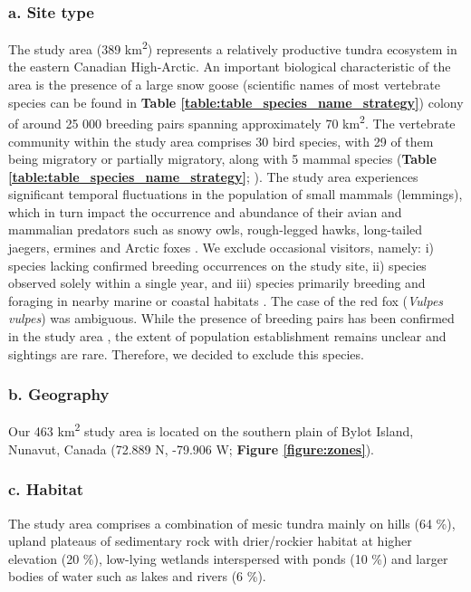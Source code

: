 \documentclass[a4paper,twoside,12pt]{article}
\begin{document}
                        \subsubsection*{a. Site type}
  The study area (389 km\textsuperscript{2}) represents a relatively productive tundra ecosystem in the eastern Canadian High-Arctic. An important biological characteristic of the area is the presence of a large snow goose (scientific names of most vertebrate species can be found in \textbf{Table \ref{table:table_species_name_strategy}}) colony of around 25 000 breeding pairs \citep{reed2002} spanning approximately 70 km\textsuperscript{2}. The vertebrate community within the study area comprises 30 bird species, with 29 of them being migratory or partially migratory, along with 5 mammal species (\textbf{Table \ref{table:table_species_name_strategy}}; \citet{moisan2023, gauthier2024a}). The study area experiences significant temporal fluctuations in the population of small mammals (lemmings), which in turn impact the occurrence and abundance of their avian and mammalian predators such as snowy owls, rough-legged hawks, long-tailed jaegers, ermines and Arctic foxes \citep{legagneux2012, duchesne2021}. We exclude occasional visitors, namely: i) species lacking confirmed breeding occurrences on the study site, ii) species observed solely within a single year, and iii) species primarily breeding and foraging in nearby marine or coastal habitats \citep{moisan2023}. The case of the red fox (\textit{Vulpes vulpes}) was ambiguous. While the presence of breeding pairs has been confirmed in the study area \citep{lai2022}, the extent of population establishment remains unclear and sightings are rare. Therefore, we decided to exclude this species.
                        
\newpage
                \subsubsection*{b. Geography} Our 463 km\textsuperscript{2} study area is located on the southern plain of Bylot Island, Nunavut, Canada (72.889 N, -79.906 W; \textbf{Figure \ref{figure:zones}}).
                \subsubsection*{c. Habitat}  The study area comprises a combination of mesic tundra mainly on hills (64 \%), upland plateaus of sedimentary rock with drier/rockier habitat at higher elevation (20 \%), low-lying wetlands interspersed with ponds (10 \%) and larger bodies of water such as lakes and rivers (6 \%).
\end{document}
